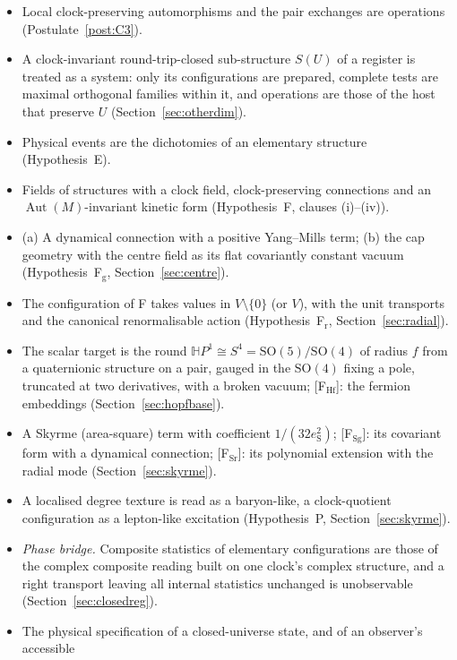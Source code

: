 \documentclass[aps,pra,onecolumn,superscriptaddress,nofootinbib,10pt]{revtex4-2}
\theoremstyle{definition}
\theoremstyle{remark}
\newcommand{\HH}{\mathbb{H}}
\newcommand{\Aut}{\operatorname{Aut}}
\newcommand{\SO}{\mathrm{SO}}
\begin{document}
\begin{itemize}[leftmargin=1.6em]
\item[{[C3]}] Local clock-preserving automorphisms and the pair exchanges are operations
(Postulate~\ref{post:C3}).
\item[{[Sub]}] A clock-invariant round-trip-closed sub-structure $S(U)$ of a register is treated as a system:
only its configurations are prepared, complete tests are maximal orthogonal families within it, and
operations are those of the host that preserve $U$ (Section~\ref{sec:otherdim}).
\item[{[E]}] Physical events are the dichotomies of an elementary structure (Hypothesis~E).
\item[{[F]}] Fields of structures with a clock field, clock-preserving connections and an
$\Aut(M)$-invariant kinetic form (Hypothesis~F, clauses (i)--(iv)).
\item[{[F$_{\mathrm g}$]}] (a) A dynamical connection with a positive Yang--Mills term; (b) the cap geometry with the
centre field as its flat covariantly constant vacuum (Hypothesis~F$_{\mathrm g}$, Section~\ref{sec:centre}).
\item[{[F$_{\mathrm r}$]}] The configuration of F takes values in $V\setminus\{0\}$ (or $V$), with the unit transports and the
canonical renormalisable action (Hypothesis~F$_{\mathrm r}$, Section~\ref{sec:radial}).
\item[{[F$_{\mathrm H}$]}] The scalar target is the round $\HH P^1\cong S^4=\SO(5)/\SO(4)$ of radius $f$ from a quaternionic structure on a
pair, gauged in the $\SO(4)$ fixing a pole, truncated at two derivatives, with a broken vacuum; [F$_{\mathrm{Hf}}$]: the
fermion embeddings (Section~\ref{sec:hopfbase}).
\item[{[F$_{\mathrm S}$]}] A Skyrme (area-square) term with coefficient $1/(32e_{\mathrm S}^2)$; [F$_{\mathrm{Sg}}$]: its covariant form with a
dynamical connection; [F$_{\mathrm{Sr}}$]: its polynomial extension with the radial mode (Section~\ref{sec:skyrme}).
\item[{[P]}] A localised degree texture is read as a baryon-like, a clock-quotient configuration as a
lepton-like excitation (Hypothesis~P, Section~\ref{sec:skyrme}).
\item[{[Ph]}] \emph{Phase bridge.}  Composite statistics of elementary configurations are those of the complex
composite reading built on one clock's complex structure, and a right transport leaving all internal
statistics unchanged is unobservable (Section~\ref{sec:closedreg}).
\item[{[U], [A]}] The physical specification of a closed-universe state, and of an observer's accessible

\end{itemize}
\end{document}
